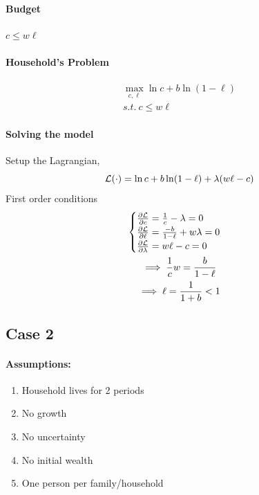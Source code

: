 \documentclass[11pt]{article}
\begin{document}
				\paragraph{Budget} $c \leq w \ell$
				\paragraph{Household's Problem}
				\begin{gather*}
					\max_{c, \ell} \ln c + b \ln (1-\ell) \\
					s.t.\ c \leq w\ell
				\end{gather*}
				\paragraph{Solving the model} Setup the Lagrangian,
				\begin{equation}
					\mathcal{{L}}(\cdot) = \ln c + b \ln (1-\ell) + \lambda (w \ell - c)
				\end{equation}
				First order conditions
				\begin{gather*}
					\begin{cases}
						\frac{\partial{\mathcal{{L}}}}{\partial{c}} = \frac{1}{c} - \lambda = 0 \\
						\frac{\partial{\mathcal{{L}}}}{\partial{\ell}} = \frac{-b}{1-\ell} + w \lambda = 0 \\
						\frac{\partial{\mathcal{{L}}}}{\partial{\lambda}} = w\ell - c = 0
					\end{cases} \\
					\implies \frac{1}{c} w = \frac{b}{1-\ell} \\
					\implies \ell = \frac{1}{1+b} < 1
				\end{gather*}
			
			\subsection{Case 2}
				\paragraph{Assumptions:}
					\begin{enumerate}
						\item Household lives for 2 periods
						\item No growth
						\item No uncertainty
						\item No initial wealth
						\item One person per family/household
					\end{enumerate}
\end{document}
